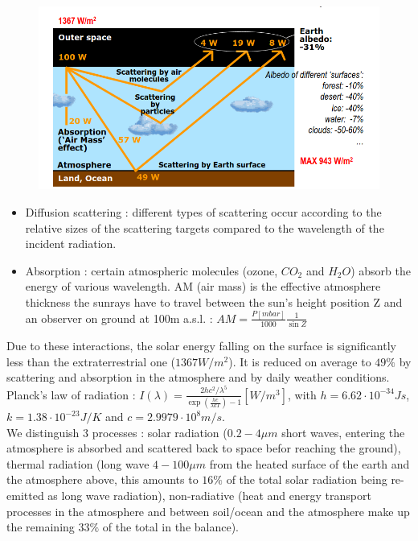 \documentclass[../main.tex]{subfiles}
\begin{document}
\begin{figure}[hbt!]
    \centering
    \includegraphics[width=0.5\linewidth]{IMAGES/Renewable/Screenshot from 2025-03-18 21-43-31.png}
\end{figure}

\begin{itemize}
    \item Diffusion scattering : different types of scattering occur according to the relative sizes of the scattering targets compared to the wavelength of the incident radiation. 
    \item Absorption : certain atmospheric molecules (ozone, $CO_2$ and $H_2O$) absorb the energy of various wavelength. AM (air mass) is the effective atmosphere thickness the sunrays have to travel between the sun's height position Z and an observer on ground at 100m a.s.l. : $AM = \frac{P[mbar]}{1000} \frac{1}{\sin Z}$ 
\end{itemize}

Due to these interactions, the solar energy falling on the surface is significantly less than the extraterrestrial one ($1367W/m^2$). It is reduced on average to $49\%$ by scattering and absorption in the atmosphere and by daily weather conditions.\\

Planck's law of radiation : $I(\lambda) = \frac{2hc^2/\lambda^5}{\exp(\frac{hc}{\lambda kT}) -1} [W/m^3]$, with $h = 6.62\cdot 10^{-34}Js$, $k = 1.38\cdot10^{-23}J/K$ and $c=2.9979\cdot 10^8 m/s$.\\

We distinguish 3 processes : solar radiation ($0.2-4\mu m$ short waves, entering the atmosphere is absorbed and scattered back to space befor reaching the ground), thermal radiation (long wave $4-100\mu m$ from the heated surface of the earth and the atmosphere above, this amounts to $16\%$ of the total solar radiation being re-emitted as long wave radiation), non-radiative (heat and energy transport processes in the atmosphere and between soil/ocean and the atmosphere make up the remaining $33\%$ of the total in the balance).\\
\end{document}
